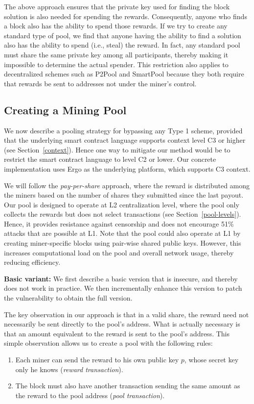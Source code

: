 \documentclass[runningheads]{llncs}
\begin{document}
The above approach ensures that the private key used for finding the block solution is also needed for spending the rewards. Consequently, anyone who finds a block also has the ability to spend those rewards. 
If we try to create any standard type of pool, we find that anyone having the ability to find a solution also has the ability to spend (i.e., steal) the reward. In fact, any standard pool must share the same private key among all participants, thereby making it impossible to determine the actual spender. This restriction also applies to decentralized schemes such as P2Pool and SmartPool because they both require that rewards be sent to addresses not under the miner's control.

\subsection{Creating a Mining Pool}

We now describe a pooling strategy for bypassing any Type 1 scheme, provided that the underlying smart contract language supports context level C3 or higher (see Section~\ref{context}). Hence one way to mitigate our method would be to restrict the smart contract language to level C2 or lower. Our concrete implementation uses Ergo as the underlying platform, which supports C3 context. 

We will follow the {\em pay-per-share} approach, where the reward is distributed among the miners based on the number of shares they submitted since the last payout. Our pool is designed to operate at L2 centralization level, where the pool only collects the rewards but does not select transactions (see Section~\ref{pool-levels}). Hence, it provides resistance against censorship and does not encourage 51\% attacks that are possible at L1. Note that the pool could also operate at L1 by creating miner-specific blocks using pair-wise shared public keys. However, this increases computational load on the pool and overall network usage, thereby reducing efficiency. %

\textbf{Basic variant:} We first describe a basic version that is  insecure, and thereby does not work in practice. We then incrementally enhance this version to patch the vulnerability to obtain the full version.

The key observation in our approach is that in a valid share, the reward need not necessarily be sent directly to the pool's address. What is actually necessary is that an amount equivalent to the reward is sent to the pool's address. This simple observation allows us to create a pool with the following rules:
\begin{enumerate}
	\item Each miner can send the reward to his own public key $p$, whose secret key only he knows ({\em reward transaction}).
	\item The block must also have another transaction sending the same amount as the reward to the pool address ({\em pool transaction}). 

\end{enumerate}
\end{document}
